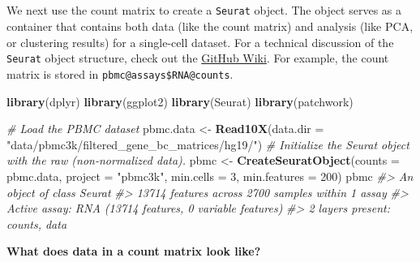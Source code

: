 \documentclass[
]{book}
\newenvironment{Shaded}{\begin{snugshade}}{\end{snugshade}}
\newcommand{\AttributeTok}[1]{\textcolor[rgb]{0.13,0.29,0.53}{#1}}
\newcommand{\CommentTok}[1]{\textcolor[rgb]{0.56,0.35,0.01}{\textit{#1}}}
\newcommand{\DecValTok}[1]{\textcolor[rgb]{0.00,0.00,0.81}{#1}}
\newcommand{\FunctionTok}[1]{\textcolor[rgb]{0.13,0.29,0.53}{\textbf{#1}}}
\newcommand{\NormalTok}[1]{#1}
\newcommand{\OtherTok}[1]{\textcolor[rgb]{0.56,0.35,0.01}{#1}}
\newcommand{\StringTok}[1]{\textcolor[rgb]{0.31,0.60,0.02}{#1}}
\begin{document}
\hypertarget{section}{%
\subsection*{}\label{section}}

We next use the count matrix to create a \texttt{Seurat} object. The object serves as a container that contains both data (like the count matrix) and analysis (like PCA, or clustering results) for a single-cell dataset. For a technical discussion of the \texttt{Seurat} object structure, check out the \href{https://github.com/satijalab/seurat/wiki}{GitHub Wiki}. For example, the count matrix is stored in \texttt{pbmc@assays\$RNA@counts}.

\begin{Shaded}
\begin{Highlighting}[]
\FunctionTok{library}\NormalTok{(dplyr)}
\FunctionTok{library}\NormalTok{(ggplot2)}
\FunctionTok{library}\NormalTok{(Seurat)}
\FunctionTok{library}\NormalTok{(patchwork)}
\end{Highlighting}
\end{Shaded}

\begin{Shaded}
\begin{Highlighting}[]
\CommentTok{\# Load the PBMC dataset}
\NormalTok{pbmc.data }\OtherTok{\textless{}{-}} \FunctionTok{Read10X}\NormalTok{(}\AttributeTok{data.dir =} \StringTok{"data/pbmc3k/filtered\_gene\_bc\_matrices/hg19/"}\NormalTok{)}
\CommentTok{\# Initialize the Seurat object with the raw (non{-}normalized data).}
\NormalTok{pbmc }\OtherTok{\textless{}{-}} \FunctionTok{CreateSeuratObject}\NormalTok{(}\AttributeTok{counts =}\NormalTok{ pbmc.data, }\AttributeTok{project =} \StringTok{"pbmc3k"}\NormalTok{, }\AttributeTok{min.cells =} \DecValTok{3}\NormalTok{, }\AttributeTok{min.features =} \DecValTok{200}\NormalTok{)}
\NormalTok{pbmc}
\CommentTok{\#\textgreater{} An object of class Seurat }
\CommentTok{\#\textgreater{} 13714 features across 2700 samples within 1 assay }
\CommentTok{\#\textgreater{} Active assay: RNA (13714 features, 0 variable features)}
\CommentTok{\#\textgreater{}  2 layers present: counts, data}
\end{Highlighting}
\end{Shaded}

\textbf{What does data in a count matrix look like?}
\end{document}
